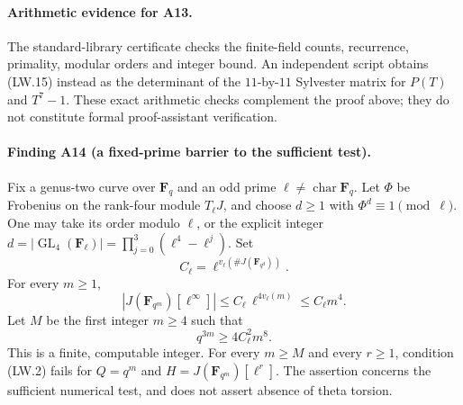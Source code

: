 \paragraph{Arithmetic evidence for A13.}
The standard-library certificate
 checks the finite-field
counts, recurrence, primality, modular orders and integer bound.
An independent script
 obtains (LW.15) instead
as the determinant of the $11$-by-$11$ Sylvester matrix for
$P(T)$ and $T^7-1$.  These exact arithmetic checks complement
the proof above; they do not constitute formal proof-assistant
verification.

\paragraph{Finding A14 (a fixed-prime barrier to the sufficient test).}
Fix a genus-two curve over $\mathbf F_q$ and an odd prime
$\ell\ne\operatorname{char}\mathbf F_q$.  Let $\Phi$ be Frobenius on
the rank-four module $T_\ell J$, and choose $d\ge1$ with
$\Phi^d\equiv1\pmod\ell$.  One may take its order modulo $\ell$,
or the explicit integer
$d=|\operatorname{GL}_4(\mathbf F_\ell)|
 =\prod_{j=0}^3(\ell^4-\ell^j)$.
Set
\[
                 C_\ell=\ell^{v_\ell(\#J(\mathbf F_{q^d}))}.
 \tag{LW.18}
\]
For every $m\ge1$,
\[
       |J(\mathbf F_{q^m})[\ell^\infty]|
                    \le C_\ell\,\ell^{4v_\ell(m)}
                    \le C_\ell m^4.
 \tag{LW.19}
\]
Let $M$ be the first integer $m\ge4$ such that
\[
                         q^{3m}\ge4C_\ell^2m^8.
 \tag{LW.20}
\]
This is a finite, computable integer.  For every $m\ge M$ and
every $r\ge1$, condition (LW.2) fails for
$Q=q^m$ and $H=J(\mathbf F_{q^m})[\ell^r]$.
The assertion concerns the sufficient numerical test, and does
not assert absence of theta torsion.

